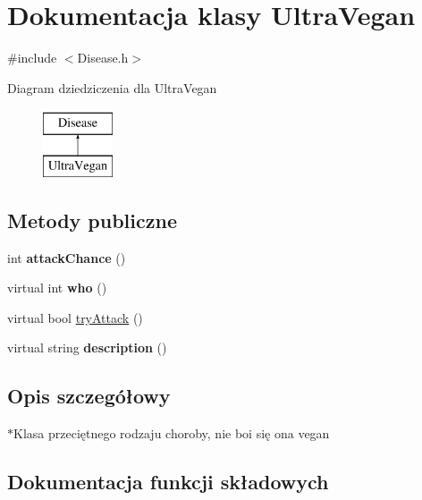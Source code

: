 \hypertarget{classUltraVegan}{}\section{Dokumentacja klasy Ultra\+Vegan}
\label{classUltraVegan}


{\ttfamily \#include $<$Disease.\+h$>$}

Diagram dziedziczenia dla Ultra\+Vegan\begin{figure}[H]
\begin{center}
\leavevmode
\includegraphics[height=2.000000cm]{classUltraVegan}
\end{center}
\end{figure}
\subsection*{Metody publiczne}
\begin{DoxyCompactItemize}
\item 
int {\bfseries attack\+Chance} ()\hypertarget{classUltraVegan_a84155389c92f4fc624722d31cd2e400f}{}\label{classUltraVegan_a84155389c92f4fc624722d31cd2e400f}

\item 
virtual int {\bfseries who} ()\hypertarget{classUltraVegan_a25c49b013633a9e9e1e8fb6a9f103f3f}{}\label{classUltraVegan_a25c49b013633a9e9e1e8fb6a9f103f3f}

\item 
virtual bool \hyperlink{classUltraVegan_a40927f8fbccf4c87f0ce72b1bcd459a3}{try\+Attack} ()
\item 
virtual string {\bfseries description} ()\hypertarget{classUltraVegan_a429d15dd51cf97460bbac469b4159998}{}\label{classUltraVegan_a429d15dd51cf97460bbac469b4159998}

\end{DoxyCompactItemize}


\subsection{Opis szczegółowy}
$\ast$\+Klasa przeciętnego rodzaju choroby, nie boi się ona vegan 

\subsection{Dokumentacja funkcji składowych}
